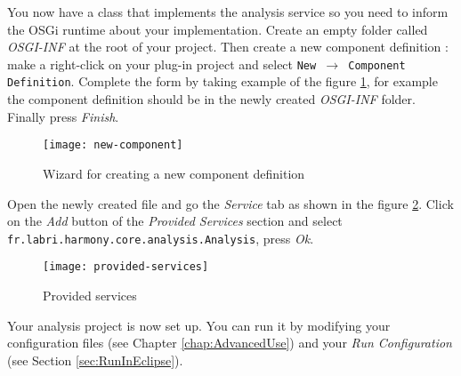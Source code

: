 
You now have a class that implements the analysis service so you need to inform the OSGi runtime about your implementation. Create an empty folder called \emph{OSGI-INF} at the root of your project. Then create a new component definition : make a right-click on your plug-in project and select \texttt{New $\rightarrow$ Component Definition}. Complete the form by taking example of the figure \ref{fig:new-component}, for example the component definition should be in the newly created  \emph{OSGI-INF} folder. Finally press \emph{Finish}.

	\begin{figure}[H]
		\centering
		\texttt{[image: new-component]}
		\caption{Wizard for creating a new component definition}
		\label{fig:new-component}
	\end{figure}
	
Open the newly created file and go the \emph{Service} tab as shown in the figure \ref{fig:provided-services}. Click on the \emph{Add} button of the \emph{Provided Services} section and select \texttt{fr.labri.harmony.core.analysis.Analysis}, press \emph{Ok}.
	
	\begin{figure}[H]
		\centering
		\texttt{[image: provided-services]}
		\caption{Provided services}
		\label{fig:provided-services}
	\end{figure}
	
Your analysis project is now set up. You can run it by modifying your configuration files (see Chapter \ref{chap:AdvancedUse}) and your \emph{Run Configuration} (see Section \ref{sec:RunInEclipse}).



%
%
%




